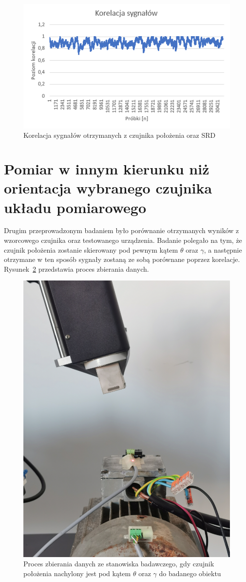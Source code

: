 \documentclass[a4paper, 12pt]{mwart}
\begin{document}
\begin{figure}[H]
	\centering
	\includegraphics[width=0.9\linewidth]{assets/korelacja1}
	\caption{Korelacja sygnałów otrzymanych z czujnika położenia oraz SRD}
	\label{fig:korelacja1}
\end{figure}

\section{Pomiar w innym kierunku niż orientacja wybranego czujnika układu pomiarowego}
Drugim przeprowadzonym badaniem było porównanie otrzymanych wyników z wzorcowego czujnika oraz testowanego urządzenia. Badanie polegało na tym, że czujnik położenia zostanie skierowany pod pewnym kątem $\theta$ oraz $\gamma$, a następnie otrzymane w ten sposób sygnały zostaną ze sobą porównane poprzez korelacje. Rysunek~\ref{fig:img20221108124849} przedstawia proces zbierania danych.
\begin{figure}[th!]
	\centering
	\includegraphics[width=0.7\linewidth]{assets/IMG_20221108_124849}
	\caption{Proces zbierania danych ze stanowiska badawczego, gdy czujnik położenia nachylony jest pod kątem $\theta$ oraz $\gamma$ do badanego obiektu}
	\label{fig:img20221108124849}
\end{figure}
\end{document}
